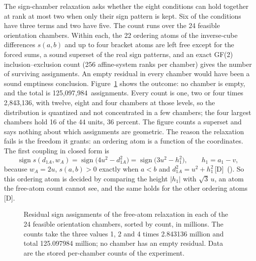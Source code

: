 \documentclass[11pt]{article}
\theoremstyle{definition}
\theoremstyle{remark}
\newcommand{\numChamberTotal}{125{,}097{,}984}
\newcommand{\numChamberUnit}{2{,}843{,}136}
\newcommand{\mk}[1]{\,{\scriptsize[#1]}}
\newcommand{\Dm}{\mk{D}}
\begin{document}
The sign-chamber relaxation asks whether the eight conditions can hold together at rank at most two when only
their sign pattern is kept. Six of the conditions have three terms and two have five. The count runs over the 24 feasible orientation
chambers. Within each, the 22 ordering atoms of the inverse-cube differences $s(a,b)$ and up to four bracket atoms are left free
except for the forced sums, a sound superset of the real sign patterns, and an exact GF(2) inclusion--exclusion count (256
affine-system ranks per chamber) gives the number of surviving assignments. An empty residual in every chamber would have been a sound
emptiness conclusion. Figure~\ref{fig:chambers} shows the outcome: no chamber is empty, and the total is \numChamberTotal\ assignments.
Every count is one, two or four times \numChamberUnit, with twelve, eight and four chambers at those levels, so the
distribution is quantized and not concentrated in a few chambers; the four largest chambers hold 16 of the 44 units, 36 percent.
The figure counts a superset and says nothing about which assignments are geometric. The reason the relaxation fails
is the freedom it grants: an ordering atom is a function of the coordinates. The first coupling in closed form is
\begin{equation}\label{eq:coupling}
\operatorname{sign}s(d_{1A},w_A)=\operatorname{sign}\bigl(4u^2-d_{1A}^2\bigr)=\operatorname{sign}\bigl(3u^2-h_1^2\bigr),\qquad h_1=a_1-v,
\end{equation}
because $w_A=2u$, $s(a,b)>0$ exactly when $a<b$ and $d_{1A}^2=u^2+h_1^2$\Dm\ (). %
So this ordering atom is decided by comparing the height $|h_1|$ with $\sqrt3\,u$, an atom the free-atom count cannot see, and
the same holds for the other ordering atoms\Dm.

\begin{figure}[t]\centering
{}
\caption{Residual sign assignments of the free-atom relaxation in each of the 24 feasible orientation chambers,
sorted by count, in millions. The counts take the three values 1, 2 and 4 times 2.843136 million and total 125.097984 million;
no chamber has an empty residual. Data are the stored per-chamber counts of the experiment.}\label{fig:chambers}
\end{figure}
\end{document}
